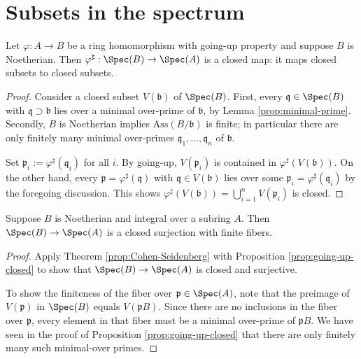 \section{Subsets in the spectrum}
\begin{proposition}\label{prop:going-up-closed}
	Let $\varphi: A \to B$ be a ring homomorphism with going-up property and suppose $B$ is Noetherian. Then $\varphi^\sharp: \Spec(B) \to \Spec(A)$ is a closed map: it maps closed subsets to closed subsets.
\end{proposition}
\begin{proof}
	Consider a closed subset $V(\mathfrak{b})$ of $\Spec(B)$. First, every $\mathfrak{q} \in \Spec(B)$ with $\mathfrak{q} \supset \mathfrak{b}$ lies over a minimal over-prime of $\mathfrak{b}$, by Lemma \ref{prop:minimal-prime}. Secondly, $B$ is Noetherian implies $\text{Ass}(B/\mathfrak{b})$ is finite; in particular there are only finitely many minimal over-primes $\mathfrak{q}_1, \ldots, \mathfrak{q}_n$ of $\mathfrak{b}$.
	
	Set $\mathfrak{p}_i := \varphi^\sharp(\mathfrak{q}_i)$ for all $i$. By going-up, $V(\mathfrak{p}_i)$ is contained in $\varphi^\sharp(V(\mathfrak{b}))$. On the other hand, every $\mathfrak{p} = \varphi^\sharp(\mathfrak{q})$ with $\mathfrak{q} \in V(\mathfrak{b})$ lies over some $\mathfrak{p}_i = \varphi^\sharp(\mathfrak{q}_i)$ by the foregoing discussion. This shows $\varphi^\sharp(V(\mathfrak{b})) = \bigcup_{i=1}^n V(\mathfrak{p}_i)$ is closed.
\end{proof}

\begin{corollary}
	Suppose $B$ is Noetherian and integral over a subring $A$. Then $\Spec(B) \to \Spec(A)$ is a closed surjection with finite fibers.
\end{corollary}
\begin{proof}
	Apply Theorem \ref{prop:Cohen-Seidenberg} with Proposition \ref{prop:going-up-closed} to show that $\Spec(B) \to \Spec(A)$ is closed and surjective.

	To show the finiteness of the fiber over $\mathfrak{p} \in \Spec(A)$, note that the preimage of $V(\mathfrak{p})$ in $\Spec(B)$ equals $V(\mathfrak{p}B)$. Since there are no inclusions in the fiber over $\mathfrak{p}$, every element in that fiber must be a minimal over-prime of $\mathfrak{p}B$. We have seen in the proof of Proposition \ref{prop:going-up-closed} that there are only finitely many such minimal-over primes.
\end{proof}

